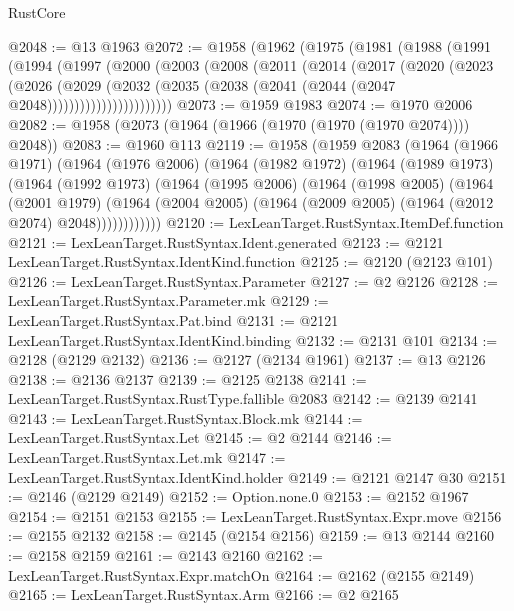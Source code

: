\begin{lexlean}{RustCore}
\begin{coremodule}
@2048 := @13 @1963
@2072 := @1958
    (@1962
      (@1975
        (@1981
          (@1988
            (@1991
              (@1994
                (@1997
                  (@2000
                    (@2003
                      (@2008
                        (@2011
                          (@2014
                            (@2017
                              (@2020
                                (@2023
                                  (@2026
                                    (@2029
                                      (@2032
                                        (@2035
                                          (@2038 (@2041 (@2044 (@2047 @2048)))))))))))))))))))))))
@2073 := @1959 @1983
@2074 := @1970 @2006
@2082 := @1958 (@2073 (@1964 (@1966 (@1970 (@1970 (@1970 @2074)))) @2048))
@2083 := @1960 @113
@2119 := @1958
    (@1959
      @2083
      (@1964
        (@1966 @1971)
        (@1964
          (@1976 @2006)
          (@1964
            (@1982 @1972)
            (@1964
              (@1989 @1973)
              (@1964
                (@1992 @1973)
                (@1964
                  (@1995 @2006)
                  (@1964
                    (@1998 @2005)
                    (@1964
                      (@2001 @1979)
                      (@1964
                        (@2004 @2005)
                        (@1964 (@2009 @2005) (@1964 (@2012 @2074) @2048))))))))))))
@2120 := LexLeanTarget.RustSyntax.ItemDef.function
@2121 := LexLeanTarget.RustSyntax.Ident.generated
@2123 := @2121 LexLeanTarget.RustSyntax.IdentKind.function
@2125 := @2120 (@2123 @101)
@2126 := LexLeanTarget.RustSyntax.Parameter
@2127 := @2 @2126
@2128 := LexLeanTarget.RustSyntax.Parameter.mk
@2129 := LexLeanTarget.RustSyntax.Pat.bind
@2131 := @2121 LexLeanTarget.RustSyntax.IdentKind.binding
@2132 := @2131 @101
@2134 := @2128 (@2129 @2132)
@2136 := @2127 (@2134 @1961)
@2137 := @13 @2126
@2138 := @2136 @2137
@2139 := @2125 @2138
@2141 := LexLeanTarget.RustSyntax.RustType.fallible @2083
@2142 := @2139 @2141
@2143 := LexLeanTarget.RustSyntax.Block.mk
@2144 := LexLeanTarget.RustSyntax.Let
@2145 := @2 @2144
@2146 := LexLeanTarget.RustSyntax.Let.mk
@2147 := LexLeanTarget.RustSyntax.IdentKind.holder
@2149 := @2121 @2147 @30
@2151 := @2146 (@2129 @2149)
@2152 := Option.none.{0}
@2153 := @2152 @1967
@2154 := @2151 @2153
@2155 := LexLeanTarget.RustSyntax.Expr.move
@2156 := @2155 @2132
@2158 := @2145 (@2154 @2156)
@2159 := @13 @2144
@2160 := @2158 @2159
@2161 := @2143 @2160
@2162 := LexLeanTarget.RustSyntax.Expr.matchOn
@2164 := @2162 (@2155 @2149)
@2165 := LexLeanTarget.RustSyntax.Arm
@2166 := @2 @2165

\end{coremodule}
\end{lexlean}

